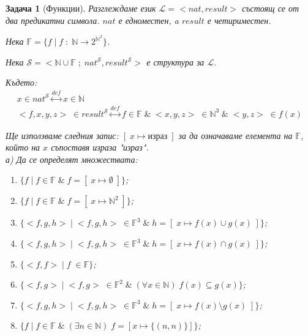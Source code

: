\documentclass[12pt]{article}
\newtheorem{problem}{Задача}%
\begin{document}
\begin{problem}[Функции]

Разглеждаме език \(\mathcal{L} = <nat, result>\) състоящ се от два предикатни символа.
\(nat\) е едноместен, a \(result\) е четириместен.

Нека \(\mathbb{F} = \{f \; | \; f \; : \; \mathbb{N} \to \displaystyle{2^{\mathbb{N}^2}}\}\).

Нека \(\mathcal{S} = <\mathbb{N} \cup \mathbb{F} \; ; \; nat^\mathcal{S}, result^\mathcal{S} >\) е структура за \(\mathcal{L}\).

Където:
\begin{eqnarray*}
x \in nat^\mathcal{S} \overset{def}{\longleftrightarrow} x \in \mathbb{N} \\
<f, x, y, z> \; \in result^\mathcal{S} \overset{def}{\longleftrightarrow} f \in \mathbb{F} \; \& \; <x, y, z> \; \in \mathbb{N}^3 \; \& \; <y, z> \; \in f(x) 
\end{eqnarray*}

Ще използваме следния запис: \([\; x \mapsto \text{израз} \; ]\) за да означаваме елемента на \(\mathbb{F}\), който на \(x\) съпоставя израза "израз". \\

а) Да се определят множествата:
\begin{enumerate}
\item \(\{ f \; | \; f \in \mathbb{F} \; \& \; f = [\;x \mapsto \emptyset\;] \}\);

\item \(\{ f \; | \; f \in \mathbb{F} \; \& \; f = [\;x \mapsto \mathbb{N}^2\;] \}\);

\item \(\{ <f, g, h> \; | \; <f, g, h> \; \in \mathbb{F}^3 \; \& \; h = [\;x \mapsto f(x) \cup g(x)\;]\}\);

\item \(\{ <f, g, h> \; | \; <f, g, h> \; \in \mathbb{F}^3 \; \& \; h = [\;x \mapsto f(x) \cap g(x)\;]\}\);

\item \(\{<f, f> \; | \; f \; \in \mathbb{F} \}\);

\item \(\{<f, g> \; | \; <f, g> \; \in \mathbb{F}^2 \; \& \; (\forall x \in \mathbb{N}) \; f(x) \subseteq g(x) \}\);

\item \(\{ <f, g, h> \; | \; <f, g, h> \; \in \mathbb{F}^3 \; \& \; h = [\;x \mapsto f(x) \setminus g(x)\;]\}\);

\item \(\{f \; | \; f \in \mathbb{F} \; \& \; (\exists n \in \mathbb{N}) \; f = [x \mapsto \{(n, n)\}] \}\);


\end{enumerate}
\end{problem}
\end{document}
